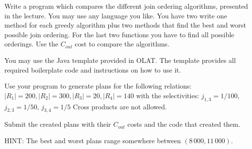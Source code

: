 
Write a program which compares the different join ordering algorithms, presented in the lecture.
You may use any language you like.
You have two write one method for each greedy algorithm plus two methods that find the best and worst possible join ordering.
For the last two functions you have to find all possible orderings.
Use the $C_{out}$ cost to compare the algorithms.

You may use the Java template provided in OLAT.
The template provides all required boilerplate code and instructions on how to use it.

Use your program to generate plans for the following relations: 
$|R_1| = 200, |R_2| = 300, |R_3| = 20, |R_4| = 140$ with the selectivities: $j_{1,3} = 1/100$, $j_{2,3} = 1/50$, $j_{3,4} = 1/5$
Cross products are not allowed.


Submit the created plans with their $C_{out}$ costs and the code that created them.

HINT: The best and worst plans range somewhere between $(8\,000,11\,000)$.
 

